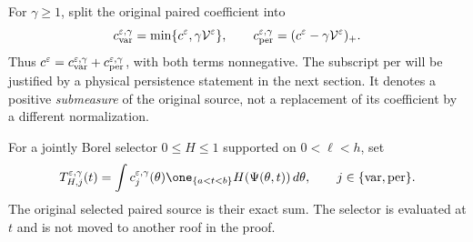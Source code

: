 For $\gamma\ge1$, split the original paired coefficient into
\begin{equation}\label{eq:v110-positive-split}
 c_{\rm var}^{\varepsilon,\gamma}
       =\min\{c^\varepsilon,\gamma\mathcal V^\varepsilon\},\qquad
 c_{\rm per}^{\varepsilon,\gamma}
       =(c^\varepsilon-\gamma\mathcal V^\varepsilon)_+.
\end{equation}
Thus $c^\varepsilon=c_{\rm var}^{\varepsilon,\gamma}
+c_{\rm per}^{\varepsilon,\gamma}$, with both terms nonnegative.
The subscript $\mathrm{per}$ will be justified by a physical
persistence statement in the next section. It denotes a positive
\emph{submeasure} of the original source, not a replacement of its
coefficient by a different normalization.

For a jointly Borel selector $0\le H\le1$ supported on $0<\ell<h$,
set
\begin{equation}\label{eq:v110-selected-sources}
 T_{H,j}^{\varepsilon,\gamma}(t)
   =\int c_j^{\varepsilon,\gamma}(\theta)
       \one_{\{a<t<b\}}H(\Psi(\theta,t))\,d\theta,
       \qquad j\in\{\mathrm{var},\mathrm{per}\}.
\end{equation}
The original selected paired source is their exact sum. The selector
is evaluated at $t$ and is not moved to another roof in the proof.

